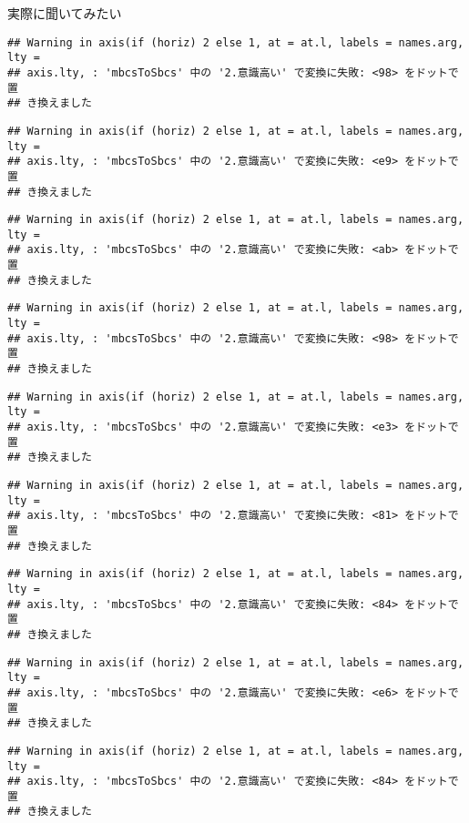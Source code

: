 \documentclass[ignorenonframetext,]{beamer}
\begin{document}
\begin{frame}[fragile]{実際に聞いてみたい}
\begin{verbatim}
## Warning in axis(if (horiz) 2 else 1, at = at.l, labels = names.arg, lty =
## axis.lty, : 'mbcsToSbcs' 中の '2.意識高い' で変換に失敗: <98> をドットで置
## き換えました
\end{verbatim}

\begin{verbatim}
## Warning in axis(if (horiz) 2 else 1, at = at.l, labels = names.arg, lty =
## axis.lty, : 'mbcsToSbcs' 中の '2.意識高い' で変換に失敗: <e9> をドットで置
## き換えました
\end{verbatim}

\begin{verbatim}
## Warning in axis(if (horiz) 2 else 1, at = at.l, labels = names.arg, lty =
## axis.lty, : 'mbcsToSbcs' 中の '2.意識高い' で変換に失敗: <ab> をドットで置
## き換えました
\end{verbatim}

\begin{verbatim}
## Warning in axis(if (horiz) 2 else 1, at = at.l, labels = names.arg, lty =
## axis.lty, : 'mbcsToSbcs' 中の '2.意識高い' で変換に失敗: <98> をドットで置
## き換えました
\end{verbatim}

\begin{verbatim}
## Warning in axis(if (horiz) 2 else 1, at = at.l, labels = names.arg, lty =
## axis.lty, : 'mbcsToSbcs' 中の '2.意識高い' で変換に失敗: <e3> をドットで置
## き換えました
\end{verbatim}

\begin{verbatim}
## Warning in axis(if (horiz) 2 else 1, at = at.l, labels = names.arg, lty =
## axis.lty, : 'mbcsToSbcs' 中の '2.意識高い' で変換に失敗: <81> をドットで置
## き換えました
\end{verbatim}

\begin{verbatim}
## Warning in axis(if (horiz) 2 else 1, at = at.l, labels = names.arg, lty =
## axis.lty, : 'mbcsToSbcs' 中の '2.意識高い' で変換に失敗: <84> をドットで置
## き換えました
\end{verbatim}

\begin{verbatim}
## Warning in axis(if (horiz) 2 else 1, at = at.l, labels = names.arg, lty =
## axis.lty, : 'mbcsToSbcs' 中の '2.意識高い' で変換に失敗: <e6> をドットで置
## き換えました
\end{verbatim}

\begin{verbatim}
## Warning in axis(if (horiz) 2 else 1, at = at.l, labels = names.arg, lty =
## axis.lty, : 'mbcsToSbcs' 中の '2.意識高い' で変換に失敗: <84> をドットで置
## き換えました
\end{verbatim}


\end{frame}
\end{document}
